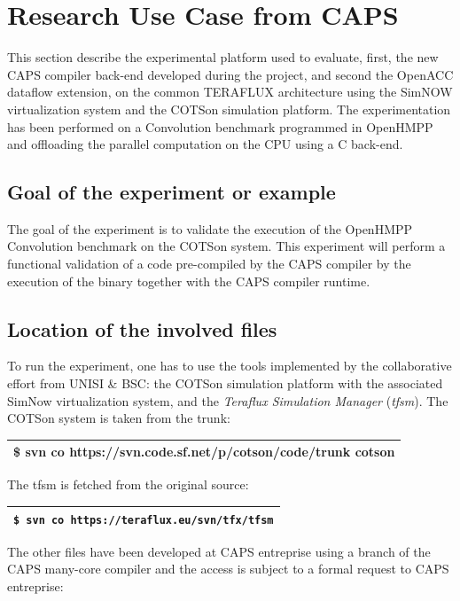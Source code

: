 \documentclass[a4paper]{article}
\begin{document}
\bigskip

\section[Research Use Case from CAPS]{Research Use Case from CAPS}
{
This section describe the experimental platform used to evaluate, first,
the new CAPS compiler back-end developed during the project, and second
the OpenACC dataflow extension, on the common TERAFLUX architecture
using the SimNOW virtualization system and the COTSon simulation
platform. The experimentation has been performed on a Convolution
benchmark programmed in OpenHMPP and offloading the parallel
computation on the CPU using a C back-end.}

\subsection[Goal of the experiment or example]{Goal of the experiment or
example}
{
The goal of the experiment is to validate the execution of the OpenHMPP
Convolution benchmark on the COTSon system. This experiment will
perform a functional validation of a code pre-compiled by the CAPS
compiler by the execution of the binary together with the CAPS compiler
runtime.}

\subsection[Location of the involved files]{Location of the involved
files}
{
To run the experiment, one has to use the tools implemented by the
collaborative effort from UNISI \& BSC: the COTSon simulation platform
with the associated SimNow virtualization system, and the
\textit{Teraflux Simulation Manager} (\textit{tfsm}). The COTSon system
is taken from the trunk:}

\begin{flushleft}
\tablehead{}
\begin{supertabular}{|m{6.15046in}|}
\hline
{}\ttfamily \$ svn co
https://svn.code.sf.net/p/cotson/code/trunk cotson\\\hline
\end{supertabular}
\end{flushleft}
{
The tfsm is fetched from the original source:}

\begin{flushleft}
\tablehead{}
\begin{supertabular}{|m{6.15046in}|}
\hline
{} \texttt{\$ svn co
}{\texttt{{https://teraflux.eu/svn/tfx/tfsm}}}\\\hline
\end{supertabular}
\end{flushleft}
{
The other files have been developed at CAPS entreprise using a branch of
the CAPS many-core compiler and the access is subject to a formal
request to CAPS entreprise:}
\end{document}
